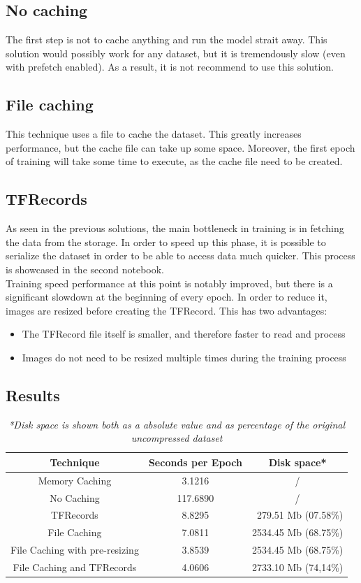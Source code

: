 \documentclass[a4paper,12pt]{article}
\begin{document}
\subsection{No caching}
The first step is not to cache anything and run the model strait away. This solution would possibly work for any dataset, but it is tremendously slow (even with prefetch enabled).
As a result, it is not recommend to use this solution.

\subsection{File caching}
This technique uses a file to cache the dataset. This greatly increases performance, but the cache file can take up some space. Moreover, the first epoch of training will take some time to execute, as the cache file need to be created.

\subsection{TFRecords}
As seen in the previous solutions, the main bottleneck in training is in fetching the data from the storage. In order to speed up this phase, it is possible to serialize the dataset in order to be able to access data much quicker. This process is showcased in the second notebook.\\
 Training speed performance at this point is notably improved, but there is a significant slowdown at the beginning of every epoch. In order to reduce it, images are resized before creating the TFRecord. This has two advantages:
\begin{itemize}
\item The TFRecord file itself is smaller, and therefore faster to read and process
\item Images do not need to be resized multiple times during the training process
\end{itemize}
 
\subsection{Results}
\begin{table}
	\centering
	\begin{tabular}{ccc}
	\textbf{Technique} & \textbf{Seconds per Epoch} & \textbf{Disk space*}\\ \hline
	Memory Caching 				& 3.1216 & /\\ \hdashline
	No Caching					& 117.6890 & / \\
	TFRecords 					& 8.8295 & \ 279.51 Mb (07.58\%)\\
	File Caching					& 7.0811	 & 2534.45 Mb (68.75\%)\\
	File Caching with pre-resizing & 3.8539 & 2534.45 Mb (68.75\%)\\
	File Caching and TFRecords 	& 4.0606 &2733.10 Mb (74,14\%)\\
	\end{tabular}
	\captionsetup{labelformat=empty}
	\caption{\textit{*Disk space is shown both as a absolute value and as percentage of the original uncompressed dataset}}
\end{table}
\end{document}
